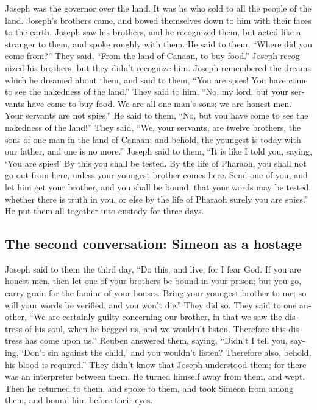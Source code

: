 \begin{paracol}{2}
\begin{otherlanguage}{english}
 Joseph was the governor over the land. It was he who sold
to all the people of the land. Joseph's brothers came, and bowed
themselves down to him with their faces to the earth. 
Joseph saw his brothers, and he recognized them, but acted like a
stranger to them, and spoke roughly with them. He said to them, ``Where
did you come from?'' They said, ``From the land of Canaan, to buy
food.''  Joseph recognized his brothers, but they didn't
recognize him.  Joseph remembered the dreams which he
dreamed about them, and said to them, ``You are spies! You have come to
see the nakedness of the land.''  They said to him, ``No,
my lord, but your servants have come to buy food.  We are
all one man's sons; we are honest men. Your servants are not spies.''
 He said to them, ``No, but you have come to see the
nakedness of the land!''  They said, ``We, your servants,
are twelve brothers, the sons of one man in the land of Canaan; and
behold, the youngest is today with our father, and one is no more.''
 Joseph said to them, ``It is like I told you, saying,
`You are spies!'  By this you shall be tested. By the
life of Pharaoh, you shall not go out from here, unless your youngest
brother comes here.  Send one of you, and let him get
your brother, and you shall be bound, that your words may be tested,
whether there is truth in you, or else by the life of Pharaoh surely you
are spies.''  He put them all together into custody for
three days.

\hypertarget{the-second-conversation-simeon-as-a-hostage}{%
\subsection{The second conversation: Simeon as a
hostage}\label{the-second-conversation-simeon-as-a-hostage}}

 Joseph said to them the third day, ``Do this, and live,
for I fear God.  If you are honest men, then let one of
your brothers be bound in your prison; but you go, carry grain for the
famine of your houses.  Bring your youngest brother to
me; so will your words be verified, and you won't die.'' They did so.
 They said to one another, ``We are certainly guilty
concerning our brother, in that we saw the distress of his soul, when he
begged us, and we wouldn't listen. Therefore this distress has come upon
us.''  Reuben answered them, saying, ``Didn't I tell you,
saying, `Don't sin against the child,' and you wouldn't listen?
Therefore also, behold, his blood is required.''  They
didn't know that Joseph understood them; for there was an interpreter
between them.  He turned himself away from them, and
wept. Then he returned to them, and spoke to them, and took Simeon from
among them, and bound him before their eyes.


\end{otherlanguage}
\end{paracol}
